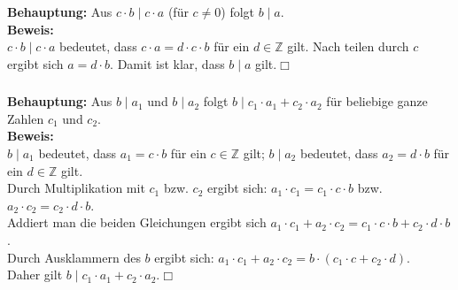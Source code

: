 \documentclass[10pt,a4paper,oneside,ngerman,numbers=noenddot]{scrartcl}
\begin{document}
\subsubsection{}
\textbf{Behauptung:} Aus $c \cdot b \mid c \cdot a$ (für $c \neq 0$) folgt $b \mid a$.\\
\textbf{Beweis:}\\
$c \cdot b \mid c \cdot a$ bedeutet, dass $c \cdot a = d\cdot c \cdot b$ für ein $d \in \mathbb{Z}$ gilt. Nach teilen durch $c$ ergibt sich $a = d \cdot b$. Damit ist klar, dass $b \mid a$ gilt.\hfill $\Box$

\subsubsection{}
\textbf{Behauptung:} Aus $b \mid a_{1}$ und $b \mid a_{2}$ folgt $b \mid c_{1} \cdot a_{1} + c_{2} \cdot a_{2}$ für beliebige ganze Zahlen $c_{1}$ und $c_{2}$.\\
\textbf{Beweis:}\\
$b \mid a_{1}$ bedeutet, dass $a_{1} = c \cdot b$ für ein $c \in \mathbb{Z}$ gilt; $b \mid a_{2}$ bedeutet, dass $a_{2} = d \cdot b$ für ein $d \in \mathbb{Z}$ gilt.\\
Durch Multiplikation mit $c_{1}$ bzw. $c_{2}$ ergibt sich: $a_{1} \cdot c_{1} = c_{1} \cdot c \cdot b$ bzw. $a_{2} \cdot c_{2} = c_{2} \cdot d \cdot b$.\\
Addiert man die beiden Gleichungen ergibt sich $a_{1} \cdot c_{1} + a_{2} \cdot c_{2} = c_{1} \cdot c \cdot b + c_{2} \cdot d \cdot b$.\\
Durch Ausklammern des $b$ ergibt sich: $a_{1} \cdot c_{1} + a_{2} \cdot c_{2} = b \cdot (c_{1} \cdot c + c_{2} \cdot d)$.\\
Daher gilt $b \mid c_{1} \cdot a_{1} + c_{2} \cdot a_{2}$.\hfill $\Box$

\section{}
\end{document}

